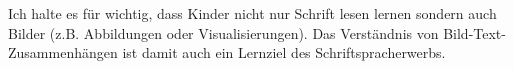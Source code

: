 Ich halte es für wichtig, dass Kinder nicht nur Schrift lesen lernen sondern auch Bilder (z.B. Abbildungen oder Visualisierungen).
Das Verständnis von Bild-Text-Zusammenhängen ist damit auch ein Lernziel des Schriftspracherwerbs.
